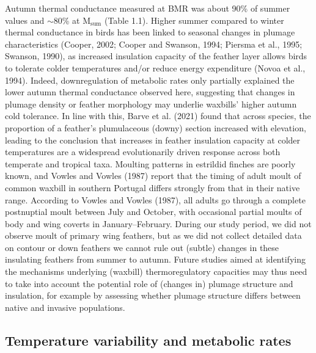 \documentclass[10pt, twoside]{book} %
\begin{document}
Autumn thermal conductance measured at BMR was about 90\% of summer values and $\sim$80\% at M$_{\text{sum}}$ (Table 1.1). Higher summer compared to winter thermal conductance in birds has been linked to seasonal changes in plumage characteristics (Cooper, 2002; Cooper and Swanson, 1994; Piersma et al., 1995; Swanson, 1990), as increased insulation capacity of the feather layer allows birds to tolerate colder temperatures and/or reduce energy expenditure (Novoa et al., 1994). Indeed, downregulation of metabolic rates only partially explained the lower autumn thermal conductance observed here, suggesting that changes in plumage density or feather morphology may underlie waxbills' higher autumn cold tolerance. In line with this, Barve et al. (2021) found that across species, the proportion of a feather's plumulaceous (downy) section increased with elevation, leading to the conclusion that increases in feather insulation capacity at colder temperatures are a widespread evolutionarily driven response across both temperate and tropical taxa. Moulting patterns in estrildid finches are poorly known, and Vowles and Vowles (1987) report that the timing of adult moult of common waxbill in southern Portugal differs strongly from that in their native range. According to Vowles and Vowles (1987), all adults go through a complete postnuptial moult between July and October, with occasional partial moults of body and wing coverts in January–February. During our study period, we did not observe moult of primary wing feathers, but as we did not collect detailed data on contour or down feathers we cannot rule out (subtle) changes in these insulating feathers from summer to autumn. Future studies aimed at identifying the mechanisms underlying (waxbill) thermoregulatory capacities may thus need to take into account the potential role of (changes in) plumage structure and insulation, for example by assessing whether plumage structure differs between native and invasive populations.\\

\subsection{Temperature variability and metabolic rates}
\end{document}
